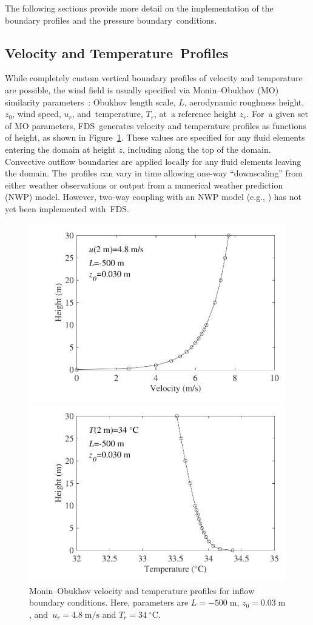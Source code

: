 \documentclass[atmosphere,article,accept,moreauthors,pdftex]{Definitions/mdpi}
\begin{document}
\begin{paracol}{2}
The following sections provide more detail on the implementation of the boundary profiles and the pressure boundary~conditions.

\subsection{Velocity and Temperature~Profiles}
\label{sec:veltmpprof}

While completely custom vertical boundary profiles of velocity and temperature are possible, the wind field is usually specified via Monin–Obukhov (MO) similarity parameters~\cite{Dyer:1974}: Obukhov length scale, $L$, aerodynamic roughness height, $z_0$, wind speed, $u_r$, and~temperature, $T_r$, at~a reference height $z_r$.  For~a given set of MO parameters, \mbox{FDS generates} velocity and temperature profiles as functions of height, as shown in \mbox{Figure~\ref{fig:MOprofs}}. These values are specified for any fluid elements entering the domain at height $z$, including along the top of the domain.  Convective outflow boundaries are applied locally for any fluid elements leaving the domain.  The~profiles can vary in time allowing one-way ``downscaling'' from either weather observations or output from a numerical weather prediction (NWP) model.  However, two-way coupling with an NWP model (e.g., \cite{coen_2013,CAWFE}) has not yet been implemented with~FDS.

\begin{figure}[H]
\includegraphics[width=.45\textwidth]{figures/vel_L=-500.pdf}

\includegraphics[width=.45\textwidth]{figures/tmp_L=-500.pdf}
\caption{Monin--Obukhov velocity and temperature profiles for inflow boundary conditions.  Here, parameters are $L=-500\;\mathrm{m}$, $z_0=0.03\;\mathrm{m}$, and~$u_r=4.8\;\mathrm{m/s}$ and $T_r=34\;^\circ\mathrm{C}$.} 
\label{fig:MOprofs}
\end{figure}


\end{paracol}
\end{document}
